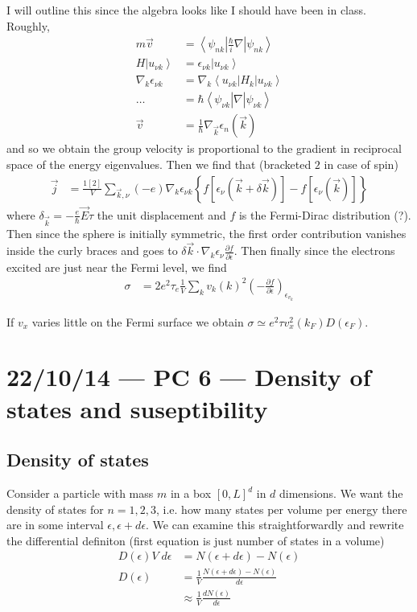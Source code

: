 \documentclass[10pt]{report}
\newcommand{\bra}[1]{\left<#1\right|}
\newcommand{\ket}[1]{\left|#1\right>}
\newcommand{\rd}[2]{\frac{d#1}{d#2}}
\newcommand{\pd}[2]{\frac{\partial #1}{\partial#2}}
\begin{document}
I will outline this since the algebra looks like I should have been in class. Roughly,
\begin{align}
    m\vec{v} &= \bra{\psi_{nk}}\frac{\hbar}{i}\nabla \ket{\psi_{nk}}\\
    H \ket{u_{\nu k}} &= \epsilon_{\nu k} \ket{u_{\nu k}}\\
    \nabla_k \epsilon_{\nu k} &= \nabla_{k}\bra{u_{\nu k}}H_k \ket{u_{\nu k}}\\
    \dots &= \hbar \bra{\psi_{\nu k}}\nabla \ket{\psi_{\nu k}}\\
    \vec{v} &= \frac{1}{\hbar}\nabla_{\vec{k}}\epsilon_n(\vec{k})
\end{align}
and so we obtain the group velocity is proportional to the gradient in reciprocal space of the energy eigenvalues. Then we find that (bracketed $2$ in case of spin)
\begin{align}
    \vec{j} &= \frac{1[2]}{V} \sum\limits_{\vec{k}, \nu}^{} (-e) \nabla_k \epsilon_{\nu k}\left\{ f\left[ \epsilon_\nu(\vec{k} + \delta \vec{k}) \right] - f\left[ \epsilon_\nu(\vec{k}) \right] \right\}
\end{align}
where $\delta_{\vec{k}} = -\frac{e}{\hbar}\vec{E}\tau$ the unit displacement and $f$ is the Fermi-Dirac distribution (?). Then since the sphere is initially symmetric, the first order contribution vanishes inside the curly braces and goes to $\delta \vec{k} \cdot \nabla_k \epsilon_\nu \pd{f}{\epsilon}$. Then finally since the electrons excited are just near the Fermi level, we find
\begin{align}
    \sigma &= 2e^2\tau_e \frac{1}{V}\sum\limits_{k}^{}v_k(k)^2 \left( -\pd{f}{\epsilon} \right)_{\epsilon_{v_k}}
\end{align}

If $v_x$ varies little on the Fermi surface we obtain $\sigma \simeq e^2\tau v_x^2(k_F)D(\epsilon_F)$. 
\chapter{22/10/14 --- PC 6 --- Density of states and suseptibility}

\section{Density of states}

Consider a particle with mass $m$ in a box $[0,L]^d$ in $d$ dimensions. We want the density of states for $n=1,2,3$, i.e. how many states per volume per energy there are in some interval $\epsilon, \epsilon + d\epsilon$. We can examine this straightforwardly and rewrite the differential definiton (first equation is just number of states in a volume)
\begin{align}
    D(\epsilon) V\;d\epsilon &= N(\epsilon + d\epsilon) - N(\epsilon)\\
    D(\epsilon) &=\frac{1}{V}\frac{N(\epsilon + d\epsilon) - N(\epsilon)}{d\epsilon}\\
    &\approx \frac{1}{V}\rd{N(\epsilon)}{\epsilon}
\end{align}
\end{document}
